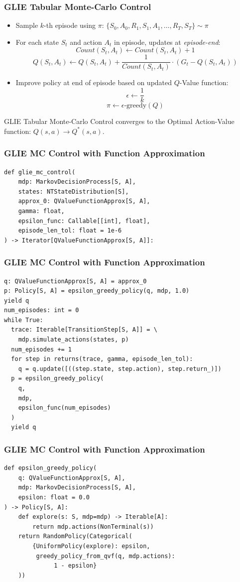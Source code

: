 \documentclass[handout]{beamer}
\begin{document}
\begin{frame}
\frametitle{GLIE Tabular Monte-Carlo Control}
\pause
\begin{itemize}[<+->]
\item  Sample $k$-th episode using $\pi$: $\{S_0, A_0, R_1, S_1, A_1, \ldots, R_T, S_T\} \sim \pi$
\item For each state $S_t$ and action $A_t$ in episode, updates at {\em episode-end}:
$$Count(S_t,A_t) \leftarrow Count(S_t,A_t) + 1$$
$$Q(S_t,A_t) \leftarrow Q(S_t,A_t) + \frac 1 {Count(S_t, A_t)} \cdot (G_t - Q(S_t,A_t))$$
\item Improve policy at end of episode based on updated $Q$-Value function:
$$\epsilon \leftarrow \frac 1 k$$
$$\pi \leftarrow \epsilon \text{-greedy}(Q)$$
\end{itemize}
\pause
\begin{theorem}
GLIE Tabular Monte-Carlo Control converges to the Optimal Action-Value function: $Q(s,a) \rightarrow Q^*(s,a)$.
\end{theorem}
\end{frame}

\begin{frame}[fragile]
\frametitle{GLIE MC Control with Function Approximation}
\pause
\begin{lstlisting}
def glie_mc_control(
    mdp: MarkovDecisionProcess[S, A],
    states: NTStateDistribution[S],
    approx_0: QValueFunctionApprox[S, A],
    gamma: float,
    epsilon_func: Callable[[int], float],
    episode_len_tol: float = 1e-6
) -> Iterator[QValueFunctionApprox[S, A]]:
\end{lstlisting}
\end{frame}

\begin{frame}[fragile]
\frametitle{GLIE MC Control with Function Approximation}
\pause
\begin{lstlisting}
q: QValueFunctionApprox[S, A] = approx_0
p: Policy[S, A] = epsilon_greedy_policy(q, mdp, 1.0)
yield q
num_episodes: int = 0
while True:
  trace: Iterable[TransitionStep[S, A]] = \
    mdp.simulate_actions(states, p)
  num_episodes += 1
  for step in returns(trace, gamma, episode_len_tol):
    q = q.update([((step.state, step.action), step.return_)])
  p = epsilon_greedy_policy(
    q,
    mdp,
    epsilon_func(num_episodes)
  )
  yield q
\end{lstlisting}    
\end{frame}

\begin{frame}[fragile]
\frametitle{GLIE MC Control with Function Approximation}
\pause
\begin{lstlisting}    
def epsilon_greedy_policy(
    q: QValueFunctionApprox[S, A],
    mdp: MarkovDecisionProcess[S, A],
    epsilon: float = 0.0
) -> Policy[S, A]:
    def explore(s: S, mdp=mdp) -> Iterable[A]:
        return mdp.actions(NonTerminal(s))
    return RandomPolicy(Categorical(
        {UniformPolicy(explore): epsilon,
         greedy_policy_from_qvf(q, mdp.actions):
              1 - epsilon}
    ))
\end{lstlisting}
\end{frame}
    
\end{document}

